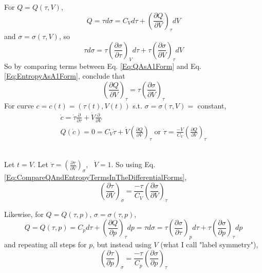 \documentclass[twoside,landscape,10pt]{amsart}
\theoremstyle{plain}
\theoremstyle{definition}
\theoremstyle{remark}
\theoremstyle{remark}
\begin{document}
\begin{multicols*}{2}
For $Q= Q(\tau, V)$, 
\begin{equation}\label{Eq:QAsA1Form}
Q = \tau d\sigma = C_V d\tau + \left( \frac{ \partial Q}{ \partial V} \right)_{\tau} dV
\end{equation}
and $\sigma = \sigma(\tau, V)$, so 
\begin{equation}\label{Eq:EntropyAsA1Form}
\tau d\sigma = \tau \left( \frac{ \partial \sigma}{ \partial \tau } \right)_V d\tau + \tau \left( \frac{ \partial \sigma}{ \partial V} \right)_{\tau} dV
\end{equation}
So by comparing terms between Eq. \ref{Eq:QAsA1Form} and Eq. \ref{Eq:EntropyAsA1Form}, conclude that 
\begin{equation}\label{Eq:CompareQAndEntropyTermsInTheDifferentialForms}
\left( \frac{ \partial Q}{ \partial V} \right)_{\tau} = \tau \left( \frac{ \partial \sigma}{\partial V} \right)_{\tau}
\end{equation} 
For curve $c= c(t) = (\tau(t), V(t))$ s.t. $\sigma = \sigma(\tau, V) = $ constant, 
\[
\begin{gathered}
\dot{c} = \dot{\tau} \frac{ \partial }{ \partial \tau} + \dot{V} \frac{ \partial }{\partial V}  \\
Q(\dot{c}) = 0 = C_V\dot{\tau} + \dot{V} \left( \frac{ \partial Q}{\partial V} \right)_{\tau} \text{ or } \dot{\tau} = \frac{- \dot{V}}{C_V} \left( \frac{\partial Q}{ \partial V} \right)_{\tau} 
\end{gathered}
\]

\quad \\ 
Let $t=V$. Let $\dot{\tau} = \left( \frac{\partial \tau}{\partial V} \right)_{\sigma}$, \, $\dot{V} = 1$.  So using Eq. \ref{Eq:CompareQAndEntropyTermsInTheDifferentialForms}, 
\begin{equation}\label{Eq:ConstantVolumeHeatCapacityDifferentialRelationship}
\left( \frac{ \partial \tau}{ \partial V} \right)_{\sigma} = \frac{-\tau}{C_V} \left( \frac{ \partial \sigma}{ \partial V} \right)_{\tau}
\end{equation}

Likewise, for $Q= Q(\tau, p)$, $\sigma = \sigma(\tau, p)$, 
\[
Q = Q(\tau, p) = C_p d\tau + \left( \frac{\partial Q}{\partial p } \right)_{\tau} dp = \tau d\sigma = \tau \left( \frac{\partial \sigma}{\partial \tau} \right)_p d\tau + \tau \left( \frac{\partial \sigma}{ \partial p} \right)_{\tau} dp
\]
and repeating all steps for $p$, but instead using $V$ (what I call "label symmetry"), 
\begin{equation}\label{Eq:ConstantPressureHeatCapacityDifferentialRelationship}
\left( \frac{\partial \tau}{\partial p } \right)_{\sigma} = \frac{-\tau}{C_p} \left( \frac{\partial \sigma}{\partial p} \right)_{\tau}
\end{equation}


\end{multicols*}
\end{document}

